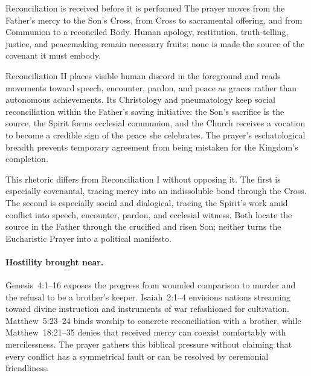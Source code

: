 \begin{studybox}{Reconciliation is received before it is performed}
The prayer moves from the Father's mercy to the Son's Cross, from Cross to sacramental offering, and from Communion to a reconciled Body. Human apology, restitution, truth-telling, justice, and peacemaking remain necessary fruits; none is made the source of the covenant it must embody.
\end{studybox}


Reconciliation II places visible human discord in the foreground and reads movements toward speech, encounter, pardon, and peace as graces rather than autonomous achievements. Its Christology and pneumatology keep social reconciliation within the Father's saving initiative: the Son's sacrifice is the source, the Spirit forms ecclesial communion, and the Church receives a vocation to become a credible sign of the peace she celebrates. The prayer's eschatological breadth prevents temporary agreement from being mistaken for the Kingdom's completion.

This rhetoric differs from Reconciliation I without opposing it. The first is especially covenantal, tracing mercy into an indissoluble bond through the Cross. The second is especially social and dialogical, tracing the Spirit's work amid conflict into speech, encounter, pardon, and ecclesial witness. Both locate the source in the Father through the crucified and risen Son; neither turns the Eucharistic Prayer into a political manifesto.

\paragraph{Hostility brought near.}
Genesis~4:1--16 exposes the progress from wounded comparison to murder and the refusal to be a brother's keeper. Isaiah~2:1--4 envisions nations streaming toward divine instruction and instruments of war refashioned for cultivation. Matthew~5:23--24 binds worship to concrete reconciliation with a brother, while Matthew~18:21--35 denies that received mercy can coexist comfortably with mercilessness. The prayer gathers this biblical pressure without claiming that every conflict has a symmetrical fault or can be resolved by ceremonial friendliness.

